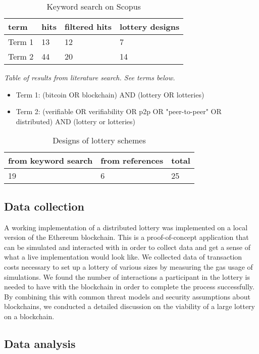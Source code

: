 \begin{table}[h]
\centering
\caption{Keyword search on Scopus}
\begin{tabular}{|l|l|l|l|}
\hline

term & hits & filtered hits & lottery designs \\ \hline
Term 1 & 13 & 12 & 7 \\ \hline
Term 2 & 44 & 20 & 14 \\ \hline

\end{tabular}
\end{table}
\emph{Table of results from literature search. See terms below.}

\begin{itemize}
    \item Term 1: (bitcoin OR blockchain) AND (lottery OR lotteries) 
    \item Term 2: (verifiable OR verifiability OR p2p OR "peer-to-peer" OR distributed) AND (lottery or lotteries)
\end{itemize}

\begin{table}[h]
\centering
\caption{Designs of lottery schemes}
\begin{tabular}{|l|l|l|}
\hline

from keyword search & from references & total \\ \hline
19 & 6 & 25 \\ \hline

\end{tabular}
\end{table}

\subsection{Data collection}

A working implementation of a distributed lottery was implemented on a local version of the Ethereum blockchain. This is a proof-of-concept application that can be simulated and interacted with in order to collect data and get a sense of what a live implementation would look like. 
We collected data of transaction costs necessary to set up a lottery of various sizes by measuring the gas usage of simulations. 
We found the number of interactions a participant in the lottery is needed to have with the blockchain in order to complete the process successfully. By combining this with common threat models and security assumptions about blockchains, we conducted a detailed discussion on the viability of a large lottery on a blockchain.

\subsection{Data analysis}

